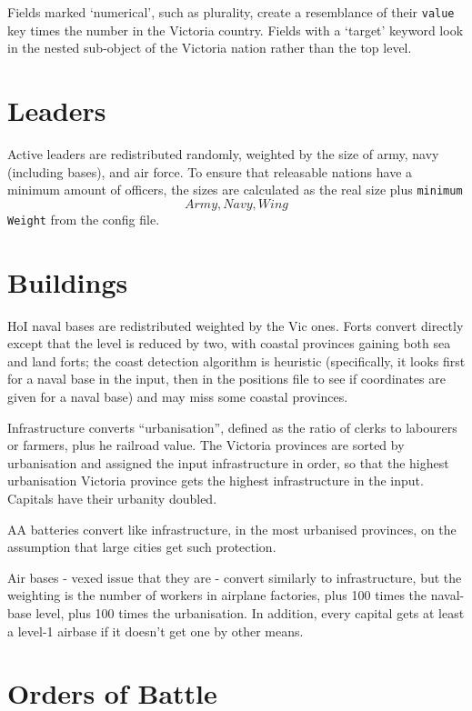 \documentclass[12pt,ebook,oneside]{book}
\begin{document}
Fields marked `numerical', such as plurality, create a resemblance of
their \texttt{value} key times the number in the Victoria
country. Fields with a `target' keyword look in the nested sub-object of
the Victoria nation rather than the top level. 

\section{Leaders}

Active leaders are redistributed randomly, weighted by the size of
army, navy (including bases), and air force. To ensure that releasable
nations have a minimum amount of officers, the sizes are calculated as
the real size plus \texttt{minimum\[Army,Navy,Wing\]Weight} from the
config file. 

\section{Buildings}

HoI naval bases are redistributed weighted by the Vic ones. Forts
convert directly except that the level is reduced by two, with coastal provinces gaining both sea and land
forts; the coast detection algorithm is heuristic
(specifically, it looks first for a naval base in the input, then in
the positions file to see if coordinates are given for a naval base)
and may miss some coastal provinces. 

Infrastructure converts ``urbanisation'', defined
as the ratio of clerks to labourers or farmers, plus he railroad value. The Victoria provinces
are sorted by urbanisation and assigned the input
infrastructure in order, so that the highest urbanisation
Victoria province gets the highest infrastructure in the
input. Capitals have their urbanity doubled. 

AA batteries convert like infrastructure, in the most urbanised
provinces, on the assumption that large cities get such protection. 

Air bases - vexed issue that they are - convert similarly to
infrastructure, but the weighting is the number of workers in airplane
factories, plus 100 times the naval-base level, plus 100 times the
urbanisation. In addition, every capital gets at least a level-1
airbase if it doesn't get one by other means. 

\section{Orders of Battle}
\end{document}
